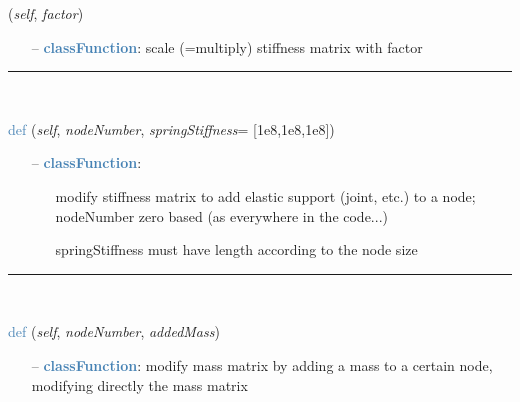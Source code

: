 \begin{itemize}[leftmargin=1.4cm]
\begin{itemize}[leftmargin=1.4cm]
\begin{itemize}[leftmargin=0.5cm]
\begin{itemize}[leftmargin=1.4cm]
\begin{itemize}[leftmargin=1.4cm]
\begin{itemize}[leftmargin=0.5cm]
\begin{flushleft}
({\it self}, {\it factor})
\end{flushleft}
\setlength{\itemindent}{0.7cm}
\begin{itemize}[leftmargin=0.7cm]
  \item[--]  \textcolor{steelblue}{\bf classFunction}: scale (=multiply) stiffness matrix with factor\vspace{12pt}\end{itemize}
%
\noindent\rule{8cm}{0.75pt}\vspace{1pt} \\ 
\begin{flushleft}
\noindent \textcolor{steelblue}{def {\bf {}}}\label{sec:FEM:FEMinterface:AddElasticSupportAtNode}
({\it self}, {\it nodeNumber}, {\it springStiffness}= [1e8,1e8,1e8])
\end{flushleft}
\setlength{\itemindent}{0.7cm}
\begin{itemize}[leftmargin=0.7cm]
  \item[--]  \textcolor{steelblue}{\bf classFunction}: \vspace{-6pt}
  \begin{itemize}[leftmargin=1.2cm]
\setlength{\itemindent}{-0.7cm}
    \item[] modify stiffness matrix to add elastic support (joint, etc.) to a node; nodeNumber zero based (as everywhere in the code...)
    \item[] springStiffness must have length according to the node size
  \end{itemize}
\vspace{12pt}\end{itemize}
%
\noindent\rule{8cm}{0.75pt}\vspace{1pt} \\ 
\begin{flushleft}
\noindent \textcolor{steelblue}{def {\bf {}}}\label{sec:FEM:FEMinterface:AddNodeMass}
({\it self}, {\it nodeNumber}, {\it addedMass})
\end{flushleft}
\setlength{\itemindent}{0.7cm}
\begin{itemize}[leftmargin=0.7cm]
  \item[--]  \textcolor{steelblue}{\bf classFunction}: modify mass matrix by adding a mass to a certain node, modifying directly the mass matrix\vspace{12pt}\end{itemize}

\end{itemize}
\end{itemize}
\end{itemize}
\end{itemize}
\end{itemize}
\end{itemize}
